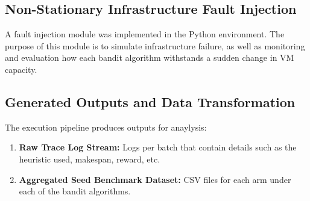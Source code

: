 \subsection{Non-Stationary Infrastructure Fault Injection}
A fault injection module was implemented in the Python environment. The purpose of this module is to simulate infrastructure failure, as well as monitoring and evaluation how each bandit algorithm withstands a sudden change in VM capacity.

\subsection{Generated Outputs and Data Transformation}
The execution pipeline produces outputs for anaylysis:
\begin{enumerate}
    \item \textbf{Raw Trace Log Stream:} Logs per batch that contain details such as the heuristic used, makespan, reward, etc.
    \item \textbf{Aggregated Seed Benchmark Dataset:} CSV files for each arm under each of the bandit algorithms.
\end{enumerate}

